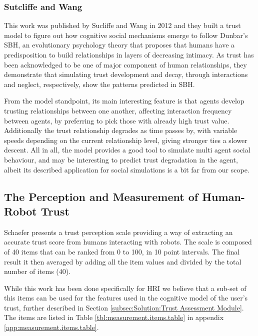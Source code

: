 \subsubsection{Sutcliffe and Wang}
\label{subsubsec:Related work:Sutcliffe and Wang}
This work was published by Sucliffe and Wang in 2012\cite{Sutcliffe2012} and they built a trust model to figure out how cognitive social mechanisms emerge to follow Dunbar's \ac{SBH}\cite{Dunbar1998}, an evolutionary psychology theory that proposes that humans have a predisposition to build relationships in layers of decreasing intimacy. As trust has been acknowledged to be one of major component of human relationships, they demonstrate that simulating trust development and decay, through interactions and neglect, respectively, show the patterns predicted in \ac{SBH}.

From the model standpoint, its main interesting feature is that agents develop trusting relationships between one another, affecting interaction frequency between agents, by preferring to pick those with already high trust value. Additionally the trust relationship degrades as time passes by, with variable speeds depending on the current relationship level, giving stronger ties a slower descent. All in all, the model provides a good tool to simulate multi agent social behaviour, and may be interesting to predict trust degradation in the agent, albeit its described application for social simulations is a bit far from our scope.

\subsection{The Perception and Measurement of Human-Robot Trust}
\label{subsec:Related work:The Perception and Measurement of Human-Robot Trust}

Schaefer\cite{Schaefer2009} presents a trust perception scale providing a way of extracting an accurate trust score from humans interacting with robots. The scale is composed of 40 items that can be ranked from 0 to 100, in 10 point intervals. The final result it then averaged by adding all the item values and divided by the total number of items (40). 

While this work has been done specifically for \ac{HRI} we believe that a sub-set of this items can be used for the features used in the cognitive model of the user's trust, further described in Section \ref{subsec:Solution:Trust Assessment Module}. The items are listed in Table \ref{tbl:measurement.items.table} in appendix \ref{app:measurement.items.table}.
